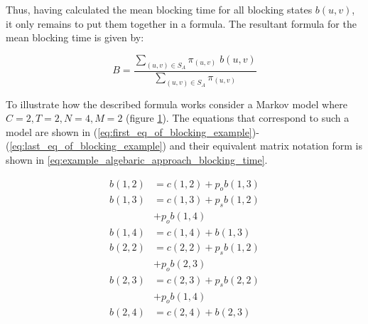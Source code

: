 Thus, having calculated the mean blocking time for all blocking states \(b(u,v)\), 
it only remains to put them together in a formula.
The resultant formula for the mean blocking time is given by:

\begin{equation}\label{eq:algebraic_blocking_time}
    B = \frac{\sum_{(u,v) \in S_A} \pi_{(u,v)} \; b(u,v)}{\sum_{(u,v) \in S_A} 
    \pi_{(u,v)}}
\end{equation}



To illustrate how the described formula works consider a Markov model where 
\(C=2, T=2, N=4, M=2\) (figure \ref{fig:example-algeb-blocking}). 
The equations that correspond to such a model are shown in 
(\ref{eq:first_eq_of_blocking_example})-(\ref{eq:last_eq_of_blocking_example}) 
and their equivalent matrix notation form is shown in 
\ref{eq:example_algebaric_approach_blocking_time}.

\begin{minipage}{.5\textwidth}
    \begin{figure}[H]
        \scalebox{0.6}{}
        \caption{
        }
        \label{fig:example-algeb-blocking}
    \end{figure}
\end{minipage}
\begin{minipage}{.43\textwidth}
    \begin{align}
        b(1,2) &= c(1,2) + p_o b(1,3) \label{eq:first_eq_of_blocking_example} \\
        b(1,3) &= c(1,3) + p_s b(1,2) \nonumber \\ &+ p_o b(1,4) \\
        b(1,4) &= c(1,4) + b(1,3) \\
        b(2,2) &= c(2,2) + p_s b(1,2) \nonumber \\ &+ p_o b(2,3) \\
        b(2,3) &= c(2,3) + p_s b(2,2) \nonumber \\ &+ p_o b(1,4) \\
        b(2,4) &= c(2,4) + b(2,3) \label{eq:last_eq_of_blocking_example}
    \end{align}
\end{minipage}

